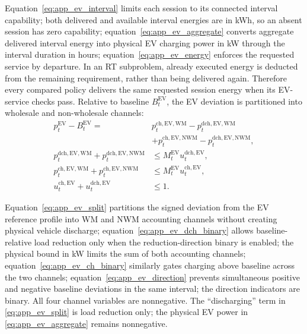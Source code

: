 \documentclass[final,5p,times]{elsarticle}
\newcommand{\EV}{\mathrm{EV}}
\newcommand{\WM}{\mathrm{WM}}
\newcommand{\NWM}{\mathrm{NWM}}
\newcommand{\ch}{\mathrm{ch}}
\newcommand{\dch}{\mathrm{dch}}
\begin{document}
Equation~\eqref{eq:app_ev_interval} limits each session to its connected interval capability; both delivered and available interval energies are in kWh, so an absent session has zero capability; equation~\eqref{eq:app_ev_aggregate} converts aggregate delivered interval energy into physical EV charging power in kW through the interval duration in hours; equation~\eqref{eq:app_ev_energy} enforces the requested service by departure. In an RT subproblem, already executed energy is deducted from the remaining requirement, rather than being delivered again.
Therefore every compared policy delivers the same requested session energy
when its EV-service checks pass. Relative to baseline $B_t^{\EV}$, the EV
deviation is partitioned into wholesale and non-wholesale channels:
\begin{align}
p_t^{\EV}-B_t^{\EV}
={}&p_t^{\ch,\EV,\WM}-p_t^{\dch,\EV,\WM}\nonumber\\
&+p_t^{\ch,\EV,\NWM}-p_t^{\dch,\EV,\NWM}, \label{eq:app_ev_split}\\
p_t^{\dch,\EV,\WM}+p_t^{\dch,\EV,\NWM}
&\le M_t^{\EV}u_t^{\dch,\EV}, \label{eq:app_ev_dch_binary}\\
p_t^{\ch,\EV,\WM}+p_t^{\ch,\EV,\NWM}
&\le M_t^{\EV}u_t^{\ch,\EV}, \label{eq:app_ev_ch_binary}\\
u_t^{\ch,\EV}+u_t^{\dch,\EV}&\le1. \label{eq:app_ev_direction}
\end{align}

Equation~\eqref{eq:app_ev_split} partitions the signed deviation from the EV reference profile into WM and NWM accounting channels without creating physical vehicle discharge; equation~\eqref{eq:app_ev_dch_binary} allows baseline-relative load reduction only when the reduction-direction binary is enabled; the physical bound in kW limits the sum of both accounting channels; equation~\eqref{eq:app_ev_ch_binary} similarly gates charging above baseline across the two channels; equation~\eqref{eq:app_ev_direction} prevents simultaneous positive and negative baseline deviations in the same interval; the direction indicators are binary.
All four channel variables are nonnegative. The ``discharging'' term in
\eqref{eq:app_ev_split} is load reduction only; the physical EV power in
\eqref{eq:app_ev_aggregate} remains nonnegative.
\end{document}
